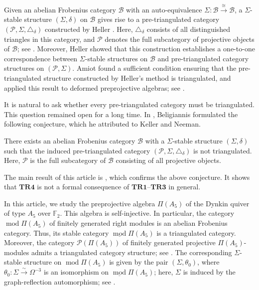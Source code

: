 \documentclass[a4paper,reqno,10pt]{amsart}
\numberwithin{equation}{section}
\DeclareMathOperator{\modu}{mod}
\newcommand{\ol}[1]{\underline{#1}}
\begin{document}
Given an abelian Frobenius category $\mathcal B$ with an auto-equivalence 
$\Sigma\colon \mathcal B\xrightarrow\cong \mathcal B$, a $\Sigma$-stable structure $(\Sigma,\delta)$ on $\mathcal B$ 
gives rise to a pre-triangulated category $(\mathcal P,\Sigma,\triangle_\delta)$ constructed by Heller \cite{Heller1968}. 
Here, $\triangle_\delta$ consists of all distinguished triangles in this category, and 
$\mathcal P$ denotes the full subcategory of projective objects of $\mathcal B$; see . 
Moreover, Heller \cite[Theorem~16.4]{Heller1968} showed that this construction establishes a one-to-one correspondence between $\Sigma$-stable structures on $\mathcal B$ and pre-triangulated category structures on $(\mathcal P,\Sigma)$. 
Amiot found a sufficient condition ensuring that the pre-triangulated structure constructed by Heller's method is triangulated, and applied this result to deformed preprojective algebras; see \cite[Section 9]{Ami07}.



It is natural to ask whether every pre-triangulated category must be triangulated. 
This question remained open for a long time. 
In \cite[Conjecture~9.9]{Beligiannis2000}, Beligiannis formulated the following conjecture, which he attributed to Keller and Neeman.

\begin{conjecture}
There exists an abelian Frobenius category $\mathcal B$ with a $\Sigma$-stable structure $(\Sigma,\delta)$ such that the induced pre-triangulated category $(\mathcal P,\Sigma,\triangle_\delta)$ is not triangulated. Here, $\mathcal P$ is the full subcategory of $\mathcal B$ consisting of all projective objects.
\end{conjecture}

The main result of this article is , which confirms the above conjecture. It shows that $\mathbf{TR4}$ is not
a formal consequence of $\mathbf{TR1}$--$\mathbf{TR3}$ in general. 


 In this article, we study the preprojective algebra $\Pi(A_5)$ of the Dynkin quiver of type $A_5$ over $\mathbb F_2$. 
This algebra is self-injective. In particular, the category $\modu \Pi(A_5)$ of finitely generated right modules is an abelian Frobenius category. 
Thus, its stable category $\ol{\modu}\Pi(A_5)$ is a triangulated category. 
Moreover, the category $\mathcal P(\Pi(A_5))$ of finitely generated projective $\Pi(A_5)$-modules admits a triangulated category structure; see . 
The corresponding $\Sigma$-stable structure on $\modu \Pi(A_5)$ is given by the pair $(\Sigma, \theta_0)$, where $\theta_0:\Sigma\xrightarrow{\sim}\Omega^{-3}$ is an isomorphism on $\ol{\modu}\Pi(A_5)$; here, $\Sigma$ is induced by the graph-reflection automorphism; see .
\end{document}
